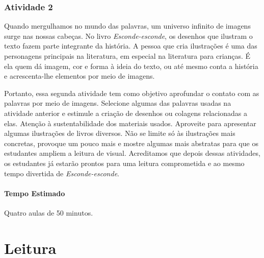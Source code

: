 \documentclass[11pt]{extarticle}
\begin{document}
\subsubsection{Atividade 2}


Quando mergulhamos no mundo das palavras, um universo infinito de imagens surge nas nossas cabeças. No livro \textit{Esconde-esconde}, os desenhos que ilustram o texto fazem parte integrante da história. A pessoa que cria ilustrações é uma das personagens principais na literatura, em especial na literatura para crianças. É ela quem dá imagem, cor e forma à ideia do texto, ou até mesmo conta a história e acrescenta-lhe elementos por meio de imagens. 

Portanto, essa segunda atividade tem como objetivo aprofundar o contato com as palavras por meio de imagens. Selecione algumas das palavras usadas na atividade anterior e estimule a criação de desenhos ou colagens relacionadas a elas. Atenção à sustentabilidade dos materiais usados. Aproveite para apresentar algumas ilustrações de livros diversos. Não se limite só às ilustrações mais concretas, provoque um pouco mais e mostre algumas mais abstratas para que os estudantes ampliem a leitura de visual. Acreditamos que depois dessas atividades, os estudantes já estarão prontos para uma leitura comprometida e ao mesmo tempo divertida de \textit{Esconde-esconde}. 

\paragraph{Tempo Estimado} Quatro aulas de 50 minutos. 

\section{Leitura}

\end{document}
